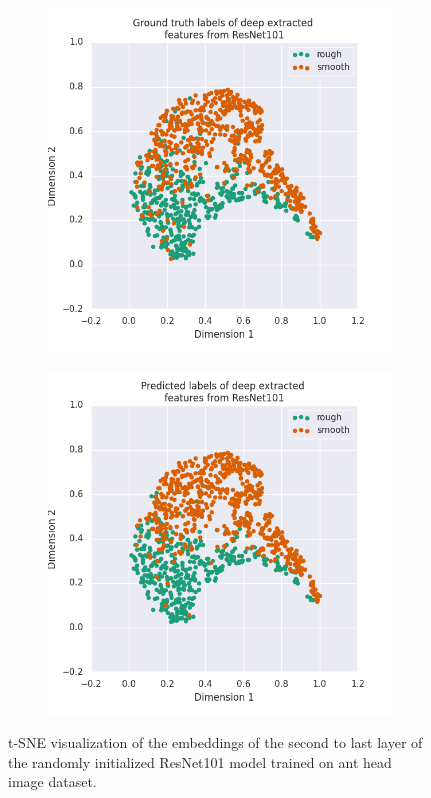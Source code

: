 \documentclass{aci}
\numberwithin{equation}{section}
\begin{document}
\begin{figure}[h]
    \centering
    \begin{subfigure}{.45\textwidth}
        \includegraphics[width=1\linewidth]{thesis_assets/plots/resnet101_gt_tsne.png}
    \end{subfigure}
    \begin{subfigure}{.45\textwidth}
        \includegraphics[width=1\linewidth]{thesis_assets/plots/resnet101_pred_tsne.png}
    \end{subfigure}
    \caption{t-SNE visualization of the embeddings of the second to last layer
        of the randomly initialized ResNet101 model trained on ant head image
        dataset.}
    \label{fig:resnet101_tsne}
\end{figure}
\end{document}
